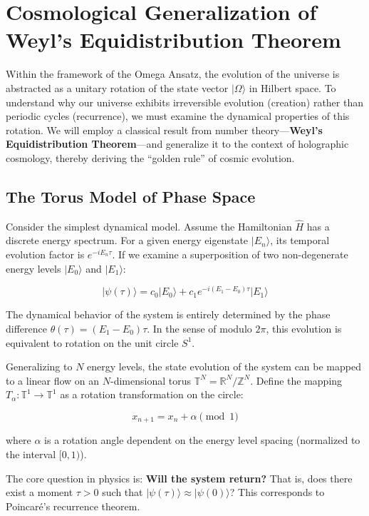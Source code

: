 \section{Cosmological Generalization of Weyl's Equidistribution Theorem}

Within the framework of the Omega Ansatz, the evolution of the universe is abstracted as a unitary rotation of the state vector $|\Omega\rangle$ in Hilbert space. To understand why our universe exhibits irreversible evolution (creation) rather than periodic cycles (recurrence), we must examine the dynamical properties of this rotation. We will employ a classical result from number theory---\textbf{Weyl's Equidistribution Theorem}---and generalize it to the context of holographic cosmology, thereby deriving the ``golden rule'' of cosmic evolution.

\subsection{The Torus Model of Phase Space}

Consider the simplest dynamical model. Assume the Hamiltonian $\hat{H}$ has a discrete energy spectrum. For a given energy eigenstate $|E_n\rangle$, its temporal evolution factor is $e^{-i E_n \tau}$. If we examine a superposition of two non-degenerate energy levels $|E_0\rangle$ and $|E_1\rangle$:

\[|\psi(\tau)\rangle = c_0 |E_0\rangle + c_1 e^{-i(E_1 - E_0)\tau} |E_1\rangle\]

The dynamical behavior of the system is entirely determined by the phase difference $\theta(\tau) = (E_1 - E_0)\tau$. In the sense of modulo $2\pi$, this evolution is equivalent to rotation on the unit circle $S^1$.

Generalizing to $N$ energy levels, the state evolution of the system can be mapped to a linear flow on an $N$-dimensional torus $\mathbb{T}^N = \mathbb{R}^N / \mathbb{Z}^N$. Define the mapping $T_\alpha: \mathbb{T}^1 \to \mathbb{T}^1$ as a rotation transformation on the circle:

\[x_{n+1} = x_n + \alpha \pmod 1\]

where $\alpha$ is a rotation angle dependent on the energy level spacing (normalized to the interval $[0, 1)$).

The core question in physics is: \textbf{Will the system return?} That is, does there exist a moment $\tau > 0$ such that $|\psi(\tau)\rangle \approx |\psi(0)\rangle$? This corresponds to Poincar\'{e}'s recurrence theorem.


